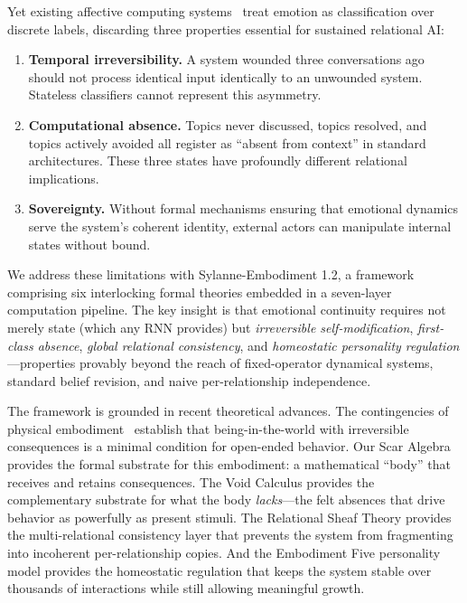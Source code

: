 \documentclass[11pt]{article}
\begin{document}
Yet existing affective computing systems~\cite{picard1997} treat emotion as classification over discrete labels, discarding three properties essential for sustained relational AI:

\begin{enumerate}[leftmargin=*]
\item \textbf{Temporal irreversibility.} A system wounded three conversations ago should not process identical input identically to an unwounded system. Stateless classifiers cannot represent this asymmetry.

\item \textbf{Computational absence.} Topics never discussed, topics resolved, and topics actively avoided all register as ``absent from context'' in standard architectures. These three states have profoundly different relational implications.

\item \textbf{Sovereignty.} Without formal mechanisms ensuring that emotional dynamics serve the system's coherent identity, external actors can manipulate internal states without bound.
\end{enumerate}

We address these limitations with Sylanne-Embodiment 1.2, a framework comprising six interlocking formal theories embedded in a seven-layer computation pipeline. The key insight is that emotional continuity requires not merely state (which any RNN provides) but \emph{irreversible self-modification}, \emph{first-class absence}, \emph{global relational consistency}, and \emph{homeostatic personality regulation}---properties provably beyond the reach of fixed-operator dynamical systems, standard belief revision, and naive per-relationship independence.

The framework is grounded in recent theoretical advances. The contingencies of physical embodiment~\cite{evolving2024} establish that being-in-the-world with irreversible consequences is a minimal condition for open-ended behavior. Our Scar Algebra provides the formal substrate for this embodiment: a mathematical ``body'' that receives and retains consequences. The Void Calculus provides the complementary substrate for what the body \emph{lacks}---the felt absences that drive behavior as powerfully as present stimuli. The Relational Sheaf Theory provides the multi-relational consistency layer that prevents the system from fragmenting into incoherent per-relationship copies. And the Embodiment Five personality model provides the homeostatic regulation that keeps the system stable over thousands of interactions while still allowing meaningful growth.
\end{document}
